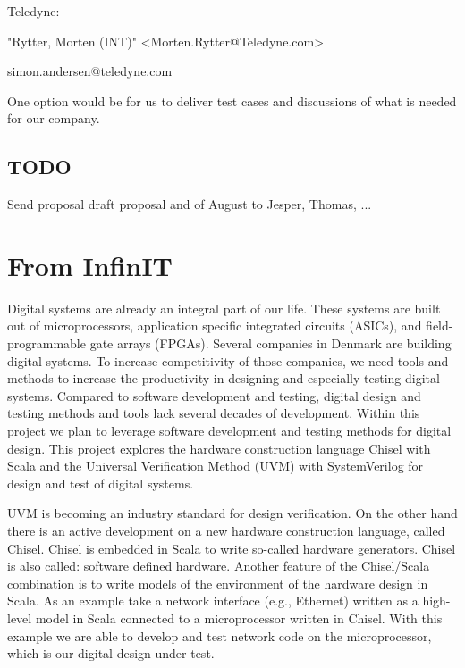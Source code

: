 \documentclass[fleqn,12pt]{article}
\begin{document}
Teledyne:

"Rytter, Morten (INT)" <Morten.Rytter@Teledyne.com>

simon.andersen@teledyne.com



One option would be for us to deliver test cases and discussions of what is needed for our company. 



\subsection{TODO}

Send proposal draft proposal and of August to Jesper, Thomas, ...

\section{From InfinIT}

Digital systems are already an integral part of our life. These systems are built out of microprocessors, application specific integrated circuits (ASICs), and field-programmable gate arrays (FPGAs). Several companies in Denmark are building digital systems. To increase competitivity of those companies, we need tools and methods to increase the productivity in designing and especially testing digital systems. Compared to software development and testing, digital design and testing methods and tools lack several decades of development. Within this project we plan to leverage software development and testing methods for digital design. This project explores the hardware construction language Chisel with Scala and the Universal Verification Method (UVM) with SystemVerilog for design and test of digital systems.



UVM is becoming an industry standard for design verification. On the other hand there is an active development on a new hardware construction language, called Chisel. Chisel is embedded in Scala to write so-called hardware generators. Chisel is also called: software defined hardware. Another feature of the Chisel/Scala combination is to write models of the environment of the hardware design in Scala. As an example take a network interface (e.g., Ethernet) written as a high-level model in Scala connected to a microprocessor written in Chisel. With this example we are able to develop and test network code on the microprocessor, which is our digital design under test.
\end{document}
